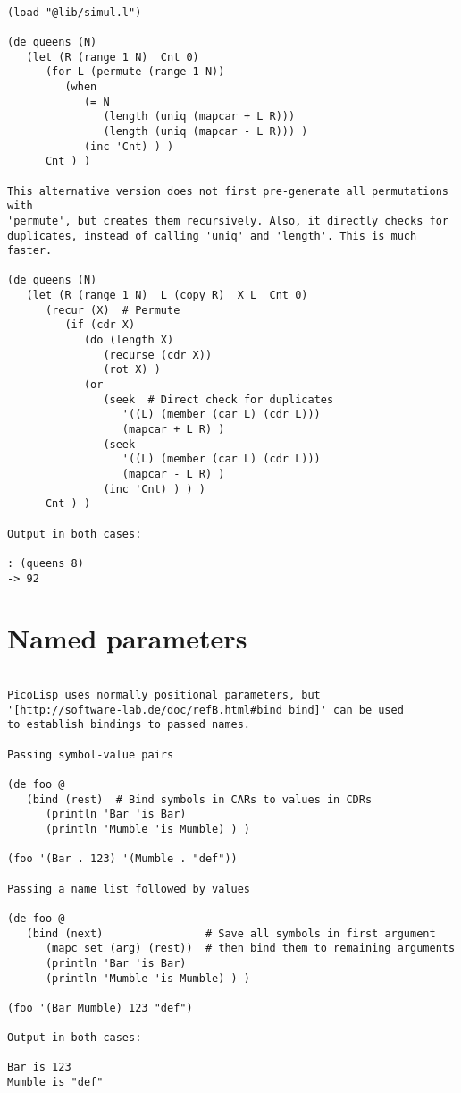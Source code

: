 \begin{verbatim}

(load "@lib/simul.l")

(de queens (N)
   (let (R (range 1 N)  Cnt 0)
      (for L (permute (range 1 N))
         (when
            (= N
               (length (uniq (mapcar + L R)))
               (length (uniq (mapcar - L R))) )
            (inc 'Cnt) ) )
      Cnt ) )

This alternative version does not first pre-generate all permutations with
'permute', but creates them recursively. Also, it directly checks for
duplicates, instead of calling 'uniq' and 'length'. This is much faster.

(de queens (N)
   (let (R (range 1 N)  L (copy R)  X L  Cnt 0)
      (recur (X)  # Permute
         (if (cdr X)
            (do (length X)
               (recurse (cdr X))
               (rot X) )
            (or
               (seek  # Direct check for duplicates
                  '((L) (member (car L) (cdr L)))
                  (mapcar + L R) )
               (seek
                  '((L) (member (car L) (cdr L)))
                  (mapcar - L R) )
               (inc 'Cnt) ) ) )
      Cnt ) )

Output in both cases:

: (queens 8)
-> 92

\end{verbatim}

\section*{Named parameters}

\begin{verbatim}

PicoLisp uses normally positional parameters, but
'[http://software-lab.de/doc/refB.html#bind bind]' can be used
to establish bindings to passed names.

Passing symbol-value pairs

(de foo @
   (bind (rest)  # Bind symbols in CARs to values in CDRs
      (println 'Bar 'is Bar)
      (println 'Mumble 'is Mumble) ) )

(foo '(Bar . 123) '(Mumble . "def"))

Passing a name list followed by values

(de foo @
   (bind (next)                # Save all symbols in first argument
      (mapc set (arg) (rest))  # then bind them to remaining arguments
      (println 'Bar 'is Bar)
      (println 'Mumble 'is Mumble) ) )

(foo '(Bar Mumble) 123 "def")

Output in both cases:

Bar is 123
Mumble is "def"

\end{verbatim}

